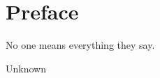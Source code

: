 %
%
\chapter*{Preface}
\thispagestyle{empty}

\epigraph{No one means everything they say.}{Unknown}

\lipsum[2-3]
